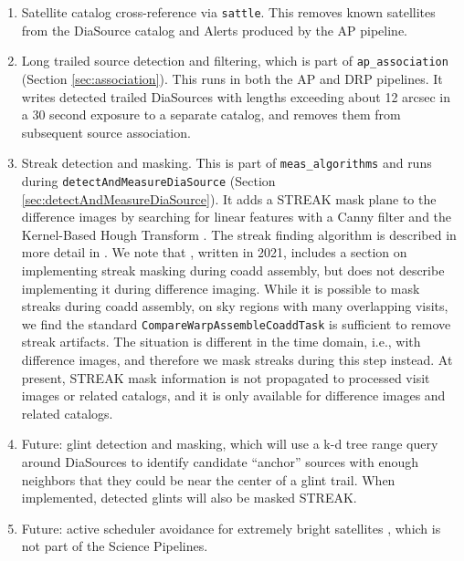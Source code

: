 \begin{enumerate}
\item Satellite catalog cross-reference via \texttt{sattle}.
This removes known satellites from the DiaSource catalog and Alerts produced by the AP pipeline.

\item Long trailed source detection and filtering, which is part of \texttt{ap\_association} (Section \ref{sec:association}).
This runs in both the AP and DRP pipelines.
It writes detected trailed DiaSources with lengths exceeding about 12 arcsec in a 30 second exposure to a separate catalog, and removes them from subsequent source association.

\item Streak detection and masking.
This is part of \texttt{meas\_algorithms} and runs during \texttt{detectAndMeasureDiaSource} (Section \ref{sec:detectAndMeasureDiaSource}).
It adds a STREAK mask plane to the difference images by searching for linear features with a Canny filter and the Kernel-Based Hough Transform \citep{2008PatRe..41..299F}.
The streak finding algorithm is described in more detail in \citet{DMTN-197}.
We note that \citet{DMTN-197}, written in 2021, includes a section on implementing streak masking during coadd assembly, but does not describe implementing it during difference imaging.
While it is possible to mask streaks during coadd assembly, on sky regions with many overlapping visits, we find the standard \texttt{CompareWarpAssembleCoaddTask} is sufficient to remove streak artifacts.
The situation is different in the time domain, i.e., with difference images, and therefore we mask streaks during this step instead.
At present, STREAK mask information is not propagated to processed visit images or related catalogs, and it is only available for difference images and related catalogs.

\item Future: glint detection and masking, which will use a k-d tree range query around DiaSources to identify candidate ``anchor'' sources with enough neighbors that they could be near the center of a glint trail.
When implemented, detected glints will also be masked STREAK.

\item Future: active scheduler avoidance for extremely bright satellites \citep{2022ApJ...941L..15H}, which is not part of the Science Pipelines.
\end{enumerate}

